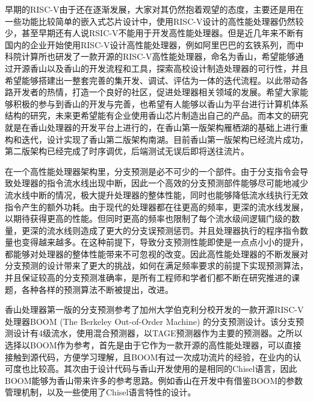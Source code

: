 
早期的RISC-V由于还在逐渐发展，大家对其仍然抱着观望的态度，主要还是用在一些功能比较简单的嵌入式芯片设计中，使用RISC-V设计的高性能处理器仍然较少，甚至早期还有人说RSIC-V不能用于开发高性能处理器。但是近几年来不断有国内的企业开始使用RISC-V设计高性能处理器，例如阿里巴巴的玄铁系列，而中科院计算所也研发了一款开源的RISC-V高性能处理器，命名为香山\cite{xiangshan}，希望能够通过开源香山以及香山的开发流程和工具，探索高校设计制造处理器的可行性，并且希望能够搭建出一整套完善的集开发、调试、评估为一体的迭代流程。以此带动各路开发者的热情，打造一个良好的社区，促进处理器相关领域的发展。希望大家能够积极的参与到香山的开发与完善，也希望有人能够以香山为平台进行计算机体系结构的研究，未来更希望能有企业使用香山芯片制造出自己的产品。而本文的研究就是在香山处理器的开发平台上进行的，在香山第一版架构雁栖湖的基础上进行重构和迭代，设计实现了香山第二版架构南湖。目前香山第一版架构已经流片成功，第二版架构已经完成了时序调优，后端测试无误后即将送往流片。

在一个高性能处理器架构里，分支预测是必不可少的一个部件。由于分支指令会导致处理器的指令流水线出现中断，因此一个高效的分支预测部件能够尽可能地减少流水线中断的情况，极大提升处理器的整体性能，同时也能够降低流水线执行无效指令产生的额外功耗。由于现代的处理器都在往更高的频率，更深的流水线发展，以期待获得更高的性能。但同时更高的频率也限制了每个流水级间逻辑门级的数量，更深的流水线则造成了更大的分支误预测惩罚。并且处理器执行的程序指令数量也变得越来越多。在这种前提下，导致分支预测性能即使是一点点小小的提升，都能够对处理器的整体性能带来不可忽视的改变。因此高性能处理器的不断发展对分支预测的设计带来了更大的挑战，如何在满足频率要求的前提下实现预测算法，并且保证较高的分支预测准确率，是所有工程师和学者们都不断在研究推进的课题，各种各样的预测算法不断被提出，改进。

香山处理器第一版的分支预测参考了加州大学伯克利分校开发的一款开源RISC-V处理器BOOM (The Berkeley Out-of-Order Machine) 的分支预测设计\cite{boom-spec}。该分支预测设计有4级流水，使用混合预测器，以TAGE预测器作为主要的预测器。之所以选择以BOOM作为参考，首先是由于它作为一款开源的高性能处理器，可以直接接触到源代码，方便学习理解，且BOOM有过一次成功流片的经验，在业内的认可度也比较高。其次由于设计代码与香山开发使用的是相同的Chisel语言，因此BOOM能够为香山带来许多的参考思路。例如香山在开发中有借鉴BOOM的参数管理机制，以及一些使用了Chisel语言特性的设计。

